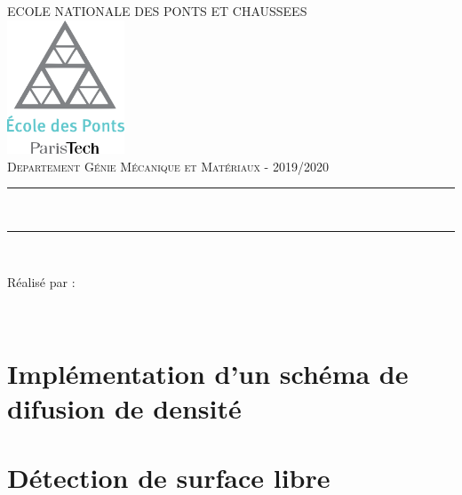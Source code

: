 \documentclass{article}
\begin{document}
\begin{titlepage}
	\thispagestyle{empty}
	\newcommand{\HRule}{\rule{\linewidth}{0.5mm}}
	\center
	\textsc{\large ECOLE NATIONALE DES PONTS ET CHAUSSEES}\\[.7cm]
	\includegraphics[width=35mm]{img/ENPC_logo.png}\\[.5cm]
	\textsc{\large Departement Génie Mécanique et Matériaux - 2019/2020}\\[0.5cm]
	
	\vspace{2cm}
	
	\HRule \\[0.4cm]
	{\LARGE {\selectfont {SPH : Projet}}
    \vspace{0.4cm}
	\HRule \\[.5cm]

\vspace{3cm}

\large Réalisé par : 

\vspace{0.5cm}

{}
\\
\vspace{1cm}


}
\end{titlepage}


\newpage
\section{Implémentation d'un schéma de difusion de densité}

\section{Détection de surface libre}
\end{document}
